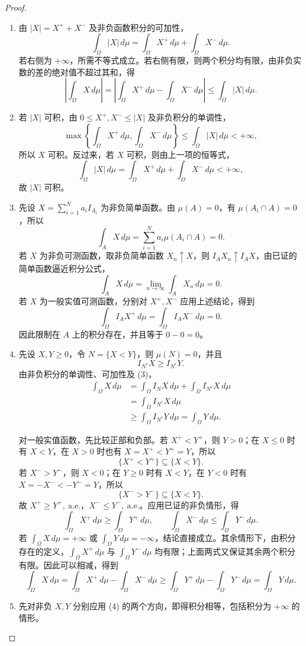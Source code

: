 \begin{proof}
\begin{enumerate}
\item 由 $|X|=X^++X^-$ 及非负函数积分的可加性，
\[
\int_\Omega|X|\,d\mu
=\int_\Omega X^+\,d\mu+\int_\Omega X^-\,d\mu.
\]
若右侧为 $+\infty$，所需不等式成立。若右侧有限，则两个积分均有限，由非负实数的差的绝对值不超过其和，得
\[
\left|\int_\Omega X\,d\mu\right|
=\left|\int_\Omega X^+\,d\mu-\int_\Omega X^-\,d\mu\right|
\leq\int_\Omega|X|\,d\mu.
\]
\item 若 $|X|$ 可积，由 $0\leq X^+,X^-\leq|X|$ 及非负积分的单调性，
\[
\max\left\{\int_\Omega X^+\,d\mu,\int_\Omega X^-\,d\mu\right\}
\leq\int_\Omega|X|\,d\mu<+\infty,
\]
所以 $X$ 可积。反过来，若 $X$ 可积，则由上一项的恒等式，
\[
\int_\Omega|X|\,d\mu
=\int_\Omega X^+\,d\mu+\int_\Omega X^-\,d\mu<+\infty,
\]
故 $|X|$ 可积。
\item 先设 $X=\sum_{i=1}^N a_iI_{A_i}$ 为非负简单函数。由 $\mu(A)=0$，有 $\mu(A_i\cap A)=0$，所以
\[
\int_A X\,d\mu
=\sum_{i=1}^N a_i\mu(A_i\cap A)=0.
\]
若 $X$ 为非负可测函数，取非负简单函数 $X_n\uparrow X$，则 $I_AX_n\uparrow I_AX$，由已证的简单函数逼近积分公式，
\[
\int_A X\,d\mu
=\lim_{n\to\infty}\int_A X_n\,d\mu=0.
\]
若 $X$ 为一般实值可测函数，分别对 $X^+,X^-$ 应用上述结论，得到
\[
\int_\Omega I_AX^+\,d\mu
=\int_\Omega I_AX^-\,d\mu=0.
\]
因此限制在 $A$ 上的积分存在，并且等于 $0-0=0$。
\item 先设 $X,Y\geq0$，令 $N=\{X<Y\}$，则 $\mu(N)=0$，并且
\[
I_{N^c}X\geq I_{N^c}Y.
\]
由非负积分的单调性、可加性及 (3)，
\begin{align*}
\int_\Omega X\,d\mu
&=\int_\Omega I_NX\,d\mu+\int_\Omega I_{N^c}X\,d\mu\\
&=\int_\Omega I_{N^c}X\,d\mu\\
&\geq\int_\Omega I_{N^c}Y\,d\mu
=\int_\Omega Y\,d\mu.
\end{align*}

对一般实值函数，先比较正部和负部。若 $X^+<Y^+$，则 $Y>0$；在 $X\leq0$ 时有 $X<Y$，在 $X>0$ 时也有 $X=X^+<Y^+=Y$，所以
\[
\{X^+<Y^+\}\subseteq\{X<Y\}.
\]
若 $X^->Y^-$，则 $X<0$；在 $Y\geq0$ 时有 $X<Y$，在 $Y<0$ 时有 $X=-X^-<-Y^-=Y$，所以
\[
\{X^->Y^-\}\subseteq\{X<Y\}.
\]
故 $X^+\geq Y^+,\ \mathrm{a.e.}$，$X^-\leq Y^-,\ \mathrm{a.e.}$。应用已证的非负情形，得
\[
\int_\Omega X^+\,d\mu\geq\int_\Omega Y^+\,d\mu,\qquad
\int_\Omega X^-\,d\mu\leq\int_\Omega Y^-\,d\mu.
\]
若 $\displaystyle\int_\Omega X\,d\mu=+\infty$ 或 $\displaystyle\int_\Omega Y\,d\mu=-\infty$，结论直接成立。其余情形下，由积分存在的定义，$\displaystyle\int_\Omega X^+\,d\mu$ 与 $\displaystyle\int_\Omega Y^-\,d\mu$ 均有限；上面两式又保证其余两个积分有限。因此可以相减，得到
\[
\int_\Omega X\,d\mu
=\int_\Omega X^+\,d\mu-\int_\Omega X^-\,d\mu
\geq\int_\Omega Y^+\,d\mu-\int_\Omega Y^-\,d\mu
=\int_\Omega Y\,d\mu.
\]
\item 先对非负 $X,Y$ 分别应用 (4) 的两个方向，即得积分相等，包括积分为 $+\infty$ 的情形。


\end{enumerate}
\end{proof}
